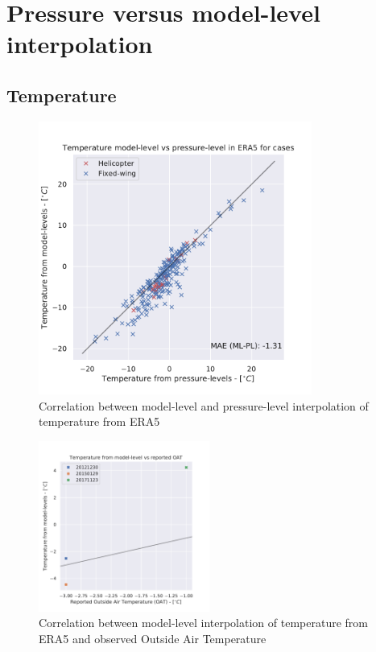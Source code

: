 \appendix
\chapter{Pressure versus model-level interpolation}
\section{Temperature}
\begin{figure}
    \centering
    \includegraphics[width=0.8\textwidth]{Figures/mlvspl.pdf}
    \caption{Correlation between model-level and pressure-level interpolation of temperature from ERA5}
    \label{fig:mlvspl}
\end{figure}

\begin{figure}
    \centering
    \includegraphics[width=0.5\textwidth]{Figures/mlvsoat.pdf}
    \caption{Correlation between model-level interpolation of temperature from ERA5 and observed Outside Air Temperature}
    \label{fig:mlvsoat}
\end{figure}

